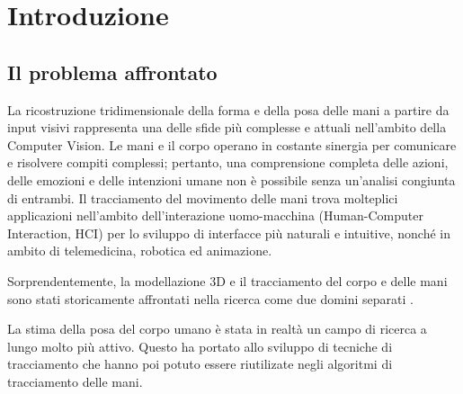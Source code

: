 \chapter{Introduzione}







\section{Il problema affrontato}

La ricostruzione tridimensionale della forma e della posa delle mani a partire da input visivi rappresenta una delle sfide più complesse e attuali nell'ambito della Computer Vision.
Le mani e il corpo operano in costante sinergia per comunicare e risolvere compiti complessi; pertanto, una comprensione completa delle azioni, delle emozioni e delle intenzioni umane non è possibile senza un'analisi congiunta di entrambi.
Il tracciamento del movimento delle mani trova molteplici applicazioni nell'ambito dell'interazione uomo-macchina (Human-Computer Interaction, HCI) per lo sviluppo di interfacce più naturali e intuitive, nonché in ambito di telemedicina, robotica ed animazione.

Sorprendentemente, la modellazione 3D e il tracciamento del corpo e delle mani sono stati storicamente affrontati nella ricerca come due domini separati \cite{MANO:SIGGRAPHASIA:2017,EROL200752}.

La stima della posa del corpo umano è stata in realtà un campo di ricerca a lungo molto più attivo.
Questo ha portato allo sviluppo di tecniche di tracciamento che hanno poi potuto essere riutilizate negli algoritmi di tracciamento delle mani.

